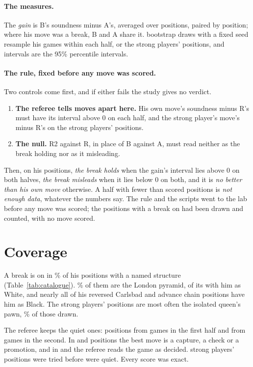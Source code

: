 \documentclass[11pt]{article}
\begin{document}
\paragraph{The measures.} The \emph{gain} is B's soundness minus A's, averaged over positions,
paired by position; where his move was a break, B and A share it. \Draws{} bootstrap draws with a
fixed seed resample his games within each half, or the strong players' positions, and intervals
are the 95\% percentile intervals.

\paragraph{The rule, fixed before any move was scored.} Two controls come first, and if either
fails the study gives no verdict.
\begin{enumerate}[nosep]
\item \textbf{The referee tells moves apart here.} His own move's soundness minus R's must have
  its interval above 0 on each half, and the strong player's move's minus R's on the strong
  players' positions.
\item \textbf{The null.} R2 against R, in place of B against A, must read neither as the break
  holding nor as it misleading.
\end{enumerate}
Then, on his positions, \emph{the break holds} when the gain's interval lies above 0 on both
halves, \emph{the break misleads} when it lies below 0 on both, and it is \emph{no better than his
own move} otherwise. A half with fewer than \MinPositions{} scored positions is \emph{not enough
data}, whatever the numbers say. The rule and the scripts went to the lab before any move was
scored; the positions with a break on had been drawn and counted, with no move scored.

\section{Coverage}

\CatalogueTable

A break is on in \OnShare\% of his positions with a named structure (Table~\ref{tab:catalogue}).
\LondonShare\% of them are the London pyramid, \LondonWhite{} of its \LondonOn{} with him as White,
and nearly all of his reversed Carlsbad and advance chain positions have him as Black. The strong
players' positions are most often the isolated queen's pawn, \StrongIqpShare\% of those drawn.

The referee keeps the quiet ones: \ScoredFirst{} positions from \ScoredGamesFirst{} games in the
first half and \ScoredSecond{} from \ScoredGamesSecond{} games in the second. In \ForcingFirst{}
and \ForcingSecond{} positions the best move is a capture, a check or a promotion, and in
\DecidedFirst{} and \DecidedSecond{} the referee reads the game as decided. \StrongTried{} strong
players' positions were tried before \StrongScored{} were quiet. Every score was exact.
\end{document}
